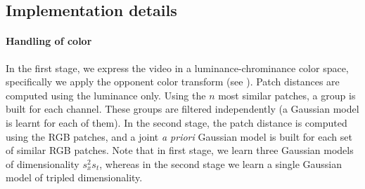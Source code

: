 \documentclass[10pt, journal, twocolumn, final, a4paper]{IEEEtran}
\begin{document}

\subsection{Implementation details}
\label{sse:implementation}

\paragraph{Handling of color} %
%
In the first stage, we express the video in a luminance-chrominance color space,
specifically we apply the opponent color transform (see \cite{Dabov2007tip,Lebrun2013a}).
Patch distances are computed using the luminance only. Using the 
$n$ most similar patches, a group is built for each channel. These
groups are filtered independently (a Gaussian model is learnt for each of them).
%
In the second stage, the patch distance is computed using the RGB patches, and
a joint \textit{a priori} Gaussian model is built for each set
of similar RGB patches. Note that in first stage, we learn three Gaussian models
of dimensionality $s_x^2s_t$, whereas in the second stage we learn a single 
Gaussian model of tripled dimensionality.
\end{document}
